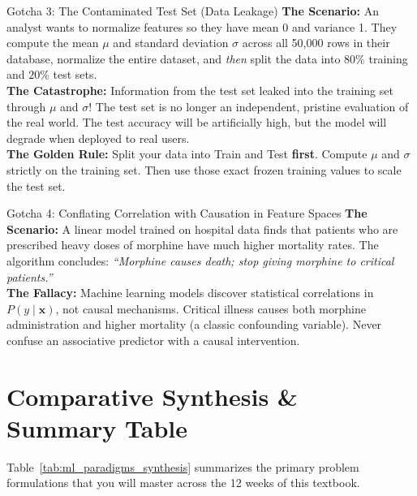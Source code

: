 \begin{trapbox}{Gotcha 3: The Contaminated Test Set (Data Leakage)}
\textbf{The Scenario:} An analyst wants to normalize features so they have mean 0 and variance 1. They compute the mean $\mu$ and standard deviation $\sigma$ across all 50,000 rows in their database, normalize the entire dataset, and \emph{then} split the data into $80\%$ training and $20\%$ test sets. \\
\textbf{The Catastrophe:} Information from the test set leaked into the training set through $\mu$ and $\sigma$! The test set is no longer an independent, pristine evaluation of the real world. The test accuracy will be artificially high, but the model will degrade when deployed to real users. \\
\textbf{The Golden Rule:} Split your data into Train and Test \textbf{first}. Compute $\mu$ and $\sigma$ strictly on the training set. Then use those exact frozen training values to scale the test set.
\end{trapbox}

\begin{trapbox}{Gotcha 4: Conflating Correlation with Causation in Feature Spaces}
\textbf{The Scenario:} A linear model trained on hospital data finds that patients who are prescribed heavy doses of morphine have much higher mortality rates. The algorithm concludes: \emph{``Morphine causes death; stop giving morphine to critical patients.''} \\
\textbf{The Fallacy:} Machine learning models discover statistical correlations in $P(y \mid \mathbf{x})$, not causal mechanisms. Critical illness causes both morphine administration and higher mortality (a classic confounding variable). Never confuse an associative predictor with a causal intervention.
\end{trapbox}

\section{Comparative Synthesis \& Summary Table}

Table~\ref{tab:ml_paradigms_synthesis} summarizes the primary problem formulations that you will master across the 12 weeks of this textbook.

